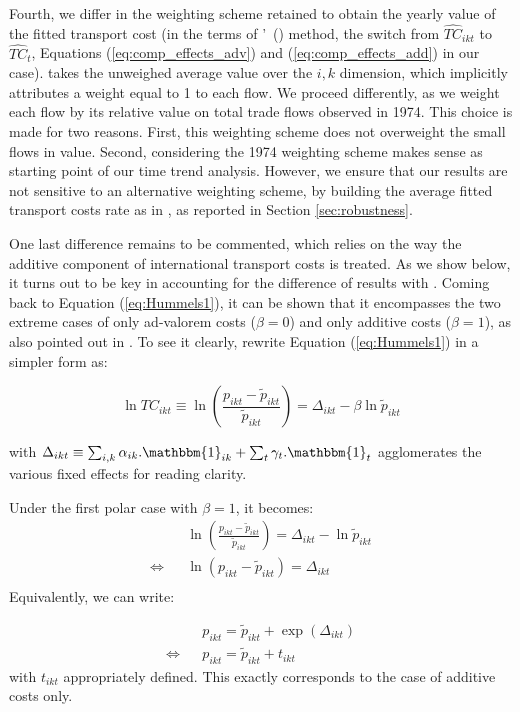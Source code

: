 \documentclass[a4paper,11pt]{article}
\newcommand\citeh[1]{\citeauthor{#1}'\ (\citeyear{#1})}
\begin{document}
Fourth, we differ in the weighting scheme retained to obtain the yearly value of the fitted transport cost (in the terms of \citeh{hummels2007} method, the switch from $\widehat{TC}_{ikt}$ to $\widehat{TC}_{t}$, Equations (\ref{eq:comp_effects_adv}) and (\ref{eq:comp_effects_add}) in our case).
\cite{hummels2007} takes the unweighed average value over the $i,k$ dimension, which implicitly attributes a weight equal to 1 to each flow.
We proceed differently, as we weight each flow by its relative value on total trade flows observed in 1974.
This choice is made for two reasons.
First, this weighting scheme does not overweight the small flows in value.
Second, considering the 1974 weighting scheme makes sense as starting point of our time trend analysis.
However, we ensure that our results are not sensitive to an alternative weighting scheme, by building the average fitted transport costs rate as in \cite{hummels2007}, as reported in Section \ref{sec:robustness}.

One last difference remains to be commented, which relies on the way the additive component of international transport costs is treated.
As we show below, it turns out to be key in accounting for the difference of results with \cite{hummels2007}.
Coming back to Equation (\ref{eq:Hummels1}), it can be shown that it encompasses the two extreme cases of only ad-valorem costs ($\beta = 0$) and only additive costs ($\beta=1$), as also pointed out in \cite{hummels_skiba}.
To see it clearly, rewrite Equation (\ref{eq:Hummels1}) in a simpler form as:

$$\ln TC_{ikt} \equiv \ln \left(\frac{p_{ikt}- \widetilde{p}_{ikt}}{\widetilde{p}_{ikt}} \right) = \Delta_{ikt}- \beta \ln \widetilde{p}_{ikt} $$

\noindent with $\Delta_{ikt} \equiv \sum_{i,k}\alpha_{ik}.\mathbbm{1}_{ik}+ \sum_{t}\gamma_{t}.\mathbbm{1}_{t}$ agglomerates the various fixed effects for reading clarity.

Under the first polar case with $\beta = 1$, it becomes:
\begin{eqnarray*}
&&\ln \left(\frac{p_{ikt}- \widetilde{p}_{ikt}}{\widetilde{p}_{ikt}} \right) = \Delta_{ikt}- \ln \widetilde{p}_{ikt} \\
\Leftrightarrow && \ln (p_{ikt}- \widetilde{p}_{ikt}) = \Delta_{ikt} \\
\end{eqnarray*}
\noindent Equivalently, we can write:

\begin{eqnarray*}
&&p_{ikt} = \widetilde{p}_{ikt} + \exp(\Delta_{ikt})\\
\Leftrightarrow && p_{ikt} = \widetilde{p}_{ikt} + t_{ikt}
\end{eqnarray*}
\noindent with $t_{ikt}$ appropriately defined.
This exactly corresponds to the case of additive costs only.
\end{document}
